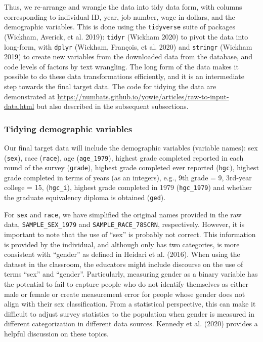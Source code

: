 \documentclass[12pt]{article}
\begin{document}
Thus, we re-arrange and wrangle the data into tidy data form, with columns corresponding to individual ID, year, job number, wage in dollars, and the demographic variables. This is done using the \texttt{tidyverse} suite of packages (Wickham, Averick, et al. 2019): \texttt{tidyr} (Wickham 2020) to pivot the data into long-form, with \texttt{dplyr} (Wickham, François, et al. 2020) and \texttt{stringr} (Wickham 2019) to create new variables from the downloaded data from the database, and code levels of factors by text wrangling. The long form of the data makes it possible to do these data transformations efficiently, and it is an intermediate step towards the final target data. The code for tidying the data are demonstrated at \url{https://numbats.github.io/yowie/articles/raw-to-input-data.html} but also described in the subsequent subsections.

\hypertarget{tidydemog}{%
\subsubsection{Tidying demographic variables}\label{tidydemog}}

Our final target data will include the demographic variables (variable names): sex (\texttt{sex}), race (\texttt{race}), age (\texttt{age\_1979}), highest grade completed reported in each round of the survey (\texttt{grade}), highest grade completed ever reported (\texttt{hgc}), highest grade completed in terms of years (as an integers), e.g., 9th grade = 9, 3rd-year college = 15, (\texttt{hgc\_i}), highest grade completed in 1979 (\texttt{hgc\_1979}) and whether the graduate equivalency diploma is obtained (\texttt{ged}).

For \texttt{sex} and \texttt{race}, we have simplified the original names provided in the raw data, \texttt{SAMPLE\_SEX\_1979} and \texttt{SAMPLE\_RACE\_78SCRN}, respectively. However, it is important to note that the use of ``sex'' is probably not correct. This information is provided by the individual, and although only has two categories, is more consistent with ``gender'' as defined in Heidari et al. (2016). When using the dataset in the classroom, the educators might include discourse on the use of terms ``sex'' and ``gender''. Particularly, measuring gender as a binary variable has the potential to fail to capture people who do not identify themselves as either male or female or create measurement error for people whose gender does not align with their sex classification. From a statistical perspective, this can make it difficult to adjust survey statistics to the population when gender is measured in different categorization in different data sources. Kennedy et al. (2020) provides a helpful discussion on these topics.
\end{document}
